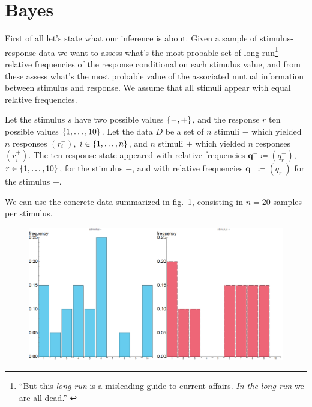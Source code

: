 \documentclass[\ifafour a4paper,12pt,\else a5paper,10pt,\fi%
onecolumn,oneside,article,%
british%
]{memoir}
\theoremstyle{remark}
\theoremstyle{innote}
\newcommand*{\citep}{\parencites}
\newcommand*{\defd}{\coloneqq}
\DeclarePairedDelimiter\set{\{}{\}}
\renewcommand*{\|}{\nonscript\,\vert\nonscript\;\mathopen{}}
\newcommand*{\sect}{\S}%
\newcommand*{\fig}{fig.}%
\newcommand*{\puzzle}{{\fontencoding{U}\fontfamily{fontawesometwo}\selectfont\symbol{225}}}
\newcommand{\mynote}[1]{ {\color{notecolour}\puzzle\ #1}}
\newcommand*{\ym}{\mathord{-}}
\newcommand*{\yp}{\mathord{+}}
\newcommand*{\yrm}{r^{-}}
\newcommand*{\yrp}{r^{+}}
\newcommand*{\yqm}{q^{-}}
\newcommand*{\yqp}{q^{+}}
\newcommand*{\yqvm}{\bm{q}^{-}}
\newcommand*{\yqvp}{\bm{q}^{+}}
\begin{document}

\section{Bayes}
\label{sec:bias_bayes}

First of all let's state what our inference is about. Given a sample of
stimulus-response data we want to assess what's the most probable set of
long-run\footnote{\enquote{But this \emph{long run} is a misleading guide
    to current affairs. \emph{In the long run} we are all dead.}
  \citep[\sect~3.I, p.~65]{keynes1923_r2013}} relative frequencies of the
response conditional on each stimulus value, and from these assess what's
the most probable value of the associated mutual information between
stimulus and response. We assume that all stimuli appear with equal
relative frequencies.

Let the stimulus $s$ have two possible values $\set{\ym,\yp}$, and the
response $r$ ten possible values $\set{1,\dotsc, 10}$. Let the data $D$ be
a set of $n$ stimuli $\ym$ which yielded $n$ responses $(\yrm_i)$,
$i \in \set{1,\dotsc, n}$, and $n$ stimuli $\yp$ which yielded $n$
responses $(\yrp_i)$. The ten response state appeared with relative
frequencies $\yqvm \defd (\yqm_r)$, $r \in \set{1,\dotsc,10}$, for the
stimulus $\ym$, and with relative frequencies $\yqvp \defd (\yqp_r)$ for
the stimulus $\yp$.

We can use the concrete data summarized in
\fig~\ref{fig:sample_histograms}, consisting in $n=20$ samples per
stimulus.
\begin{figure}[h!]
\centering\includegraphics[width=\linewidth]{samples.png}\\
\caption{}\label{fig:sample_histograms}
\end{figure}%
\end{document}
